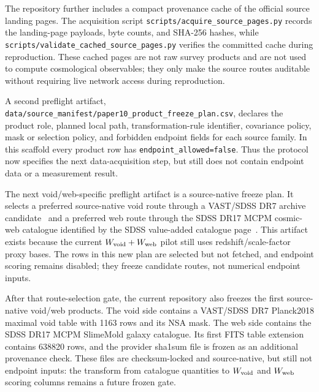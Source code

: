 \documentclass[11pt]{article}
\begin{document}
The repository further includes a compact provenance cache of the official
source landing pages. The acquisition script
\texttt{scripts/\allowbreak{}acquire\_\allowbreak{}source\_\allowbreak{}pages.py} records the landing-page payloads,
byte counts, and SHA-256 hashes, while
\texttt{scripts/\allowbreak{}validate\_\allowbreak{}cached\_\allowbreak{}source\_\allowbreak{}pages.py} verifies the committed
cache during reproduction. These cached pages are not raw survey products and
are not used to compute cosmological observables; they only make the source
routes auditable without requiring live network access during reproduction.

A second preflight artifact,
\texttt{data/\allowbreak{}source\_\allowbreak{}manifest/\allowbreak{}paper10\_\allowbreak{}product\_\allowbreak{}freeze\_\allowbreak{}plan.csv},
declares the product role, planned local path, transformation-rule identifier,
covariance policy, mask or selection policy, and forbidden endpoint fields for
each source family. In this scaffold every product row has
\texttt{endpoint\_\allowbreak{}allowed=false}. Thus the protocol now specifies the next
data-acquisition step, but still does not contain endpoint data or a
measurement result.

The next void/web-specific preflight artifact is a source-native freeze plan.
It selects a preferred source-native void route through a VAST/SDSS DR7 archive
candidate~\cite{VASTSDSSDR7VoidZenodo} and a preferred web route through the
SDSS DR17 MCPM cosmic-web catalogue identified by the SDSS value-added
catalogue page~\cite{SDSSCosmicWebVAC}. This artifact exists because the
current \(W_{\rm void}+W_{\rm web}\) pilot still uses redshift/scale-factor
proxy bases. The rows in this new plan are selected but not fetched, and
endpoint scoring remains disabled; they freeze candidate routes, not numerical
endpoint inputs.

After that route-selection gate, the current repository also freezes the first
source-native void/web products. The void side contains a VAST/SDSS DR7
Planck2018 maximal void table with 1163 rows and its NSA mask. The web side
contains the SDSS DR17 MCPM SlimeMold galaxy catalogue. Its first FITS table
extension contains 638820 rows, and the provider sha1sum file is frozen as an
additional provenance check. These files are checksum-locked and source-native,
but still not endpoint inputs: the transform from catalogue quantities to
\(W_{\rm void}\) and \(W_{\rm web}\) scoring columns remains a future frozen
gate.
\end{document}
